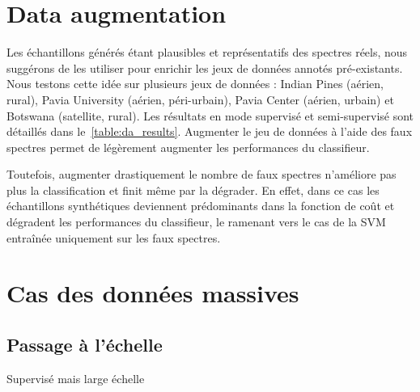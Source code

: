 \section{Data augmentation}
\label{sec:augmentation}

Les échantillons générés étant plausibles et représentatifs des spectres réels, nous suggérons de les utiliser pour enrichir les jeux de données annotés pré-existants. Nous testons cette idée sur plusieurs jeux de données : Indian Pines (aérien, rural), Pavia University (aérien, péri-urbain), Pavia Center (aérien, urbain) et Botswana (satellite, rural). Les résultats en mode supervisé et semi-supervisé sont détaillés dans le~\cref{table:da_results}. Augmenter le jeu de données à l'aide des faux spectres permet de légèrement augmenter les performances du classifieur.

Toutefois, augmenter drastiquement le nombre de faux spectres n'améliore pas plus la classification et finit même par la dégrader. En effet, dans ce cas les échantillons synthétiques deviennent prédominants dans la fonction de coût et dégradent les performances du classifieur, le ramenant vers le cas de la \gls{SVM} entraînée uniquement sur les faux spectres.

\section{Cas des données massives}

\subsection{Passage à l'échelle}

Supervisé mais large échelle



%
%
\printbibliography
